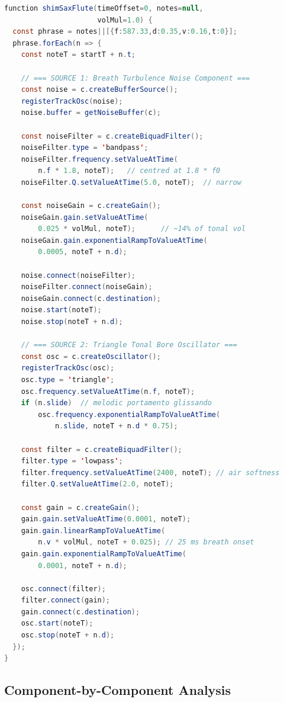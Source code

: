 \documentclass[10pt,journal,compsoc,twocolumn]{article}
\begin{document}
\begin{lstlisting}[language=Java,
    caption={\texttt{shimSaxFlute}: dual-source woodwind (line 4003).},
    label={lst:saxflute}]
function shimSaxFlute(timeOffset=0, notes=null,
                      volMul=1.0) {
  const phrase = notes||[{f:587.33,d:0.35,v:0.16,t:0}];
  phrase.forEach(n => {
    const noteT = startT + n.t;

    // === SOURCE 1: Breath Turbulence Noise Component ===
    const noise = c.createBufferSource();
    registerTrackOsc(noise);
    noise.buffer = getNoiseBuffer(c);

    const noiseFilter = c.createBiquadFilter();
    noiseFilter.type = 'bandpass';
    noiseFilter.frequency.setValueAtTime(
        n.f * 1.8, noteT);   // centred at 1.8 * f0
    noiseFilter.Q.setValueAtTime(5.0, noteT);  // narrow

    const noiseGain = c.createGain();
    noiseGain.gain.setValueAtTime(
        0.025 * volMul, noteT);      // ~14% of tonal vol
    noiseGain.gain.exponentialRampToValueAtTime(
        0.0005, noteT + n.d);

    noise.connect(noiseFilter);
    noiseFilter.connect(noiseGain);
    noiseGain.connect(c.destination);
    noise.start(noteT);
    noise.stop(noteT + n.d);

    // === SOURCE 2: Triangle Tonal Bore Oscillator ===
    const osc = c.createOscillator();
    registerTrackOsc(osc);
    osc.type = 'triangle';
    osc.frequency.setValueAtTime(n.f, noteT);
    if (n.slide)  // melodic portamento glissando
        osc.frequency.exponentialRampToValueAtTime(
            n.slide, noteT + n.d * 0.75);

    const filter = c.createBiquadFilter();
    filter.type = 'lowpass';
    filter.frequency.setValueAtTime(2400, noteT); // air softness
    filter.Q.setValueAtTime(2.0, noteT);

    const gain = c.createGain();
    gain.gain.setValueAtTime(0.0001, noteT);
    gain.gain.linearRampToValueAtTime(
        n.v * volMul, noteT + 0.025); // 25 ms breath onset
    gain.gain.exponentialRampToValueAtTime(
        0.0001, noteT + n.d);

    osc.connect(filter);
    filter.connect(gain);
    gain.connect(c.destination);
    osc.start(noteT);
    osc.stop(noteT + n.d);
  });
}
\end{lstlisting}

\subsection{Component-by-Component Analysis}
\end{document}
